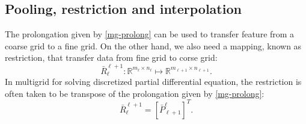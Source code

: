 \subsection{Pooling, restriction and interpolation}\label{sec:cnn-restriction}
The prolongation given by \eqref{mg-prolong} can be used to transfer
feature from a coarse grid to a fine grid.   
On the other hand, we also
need a mapping, known as restriction,  that transfer data from fine grid to corse grid:
\begin{equation}
\label{mg-restrict}
\bar R_\ell^{\ell+1}: \mathbb R^{m_{\ell}\times n_{\ell}}  \mapsto  \mathbb R^{m_{\ell+1}\times n_{\ell+1}}.
\end{equation}
In multigrid for solving discretized partial differential equation,
the restriction is often taken to be transpose of the prolongation
given by \eqref{mg-prolong}:
\begin{equation}
\label{mg-RP}
\bar R_\ell^{\ell+1} = [\bar P_{\ell+1}^\ell]^T.  
\end{equation}
